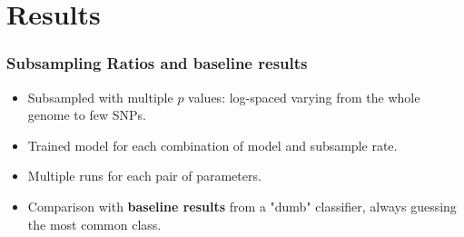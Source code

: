 \documentclass[aspectratio=169]{beamer}
\begin{document}
\section{Results}
\begin{frame}
\frametitle{Subsampling Ratios and baseline results}
\begin{itemize}
    \item Subsampled with multiple $p$ values: log-spaced varying from the whole genome to few SNPs.
  \item Trained model for each combination of model and subsample rate.
  \item Multiple runs for each pair of parameters.
  \item Comparison with \textbf{baseline results} from a "dumb" classifier, always guessing the most common class.
\end{itemize}

\vspace{0.2cm}
\centering
{}
\end{frame}
\end{document}
